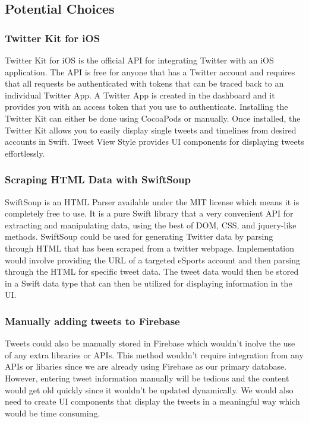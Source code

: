 \documentclass[onecolumn, draftclsnofoot,10pt, compsoc]{IEEEtran}
\begin{document}
\subsection{Potential Choices}
\subsubsection{Twitter Kit for iOS\cite{twitter}}
Twitter Kit for iOS is the official API for integrating Twitter with an iOS application.
The API is free for anyone that has a Twitter account and requires that all requests be authenticated with tokens that can be traced back to an individual Twitter App.
A Twitter App is created in the dashboard and it provides you with an access token that you use to authenticate.
Installing the Twitter Kit can either be done using CocoaPods or manually. 
Once installed, the Twitter Kit allows you to easily display single tweets and timelines from desired accounts in Swift.
Tweet View Style provides UI components for displaying tweets effortlessly. 
\subsubsection{Scraping HTML Data with SwiftSoup\cite{ssoup}}
SwiftSoup is an HTML Parser available under the MIT license which means it is completely free to use. 
It is a pure Swift library that a very convenient API for extracting and manipulating data, using the best of DOM, CSS, and jquery-like methods.
SwiftSoup could be used for generating Twitter data by parsing through HTML that has been scraped from a twitter webpage. 
Implementation would involve providing the URL of a targeted eSports account and then parsing through the HTML for specific tweet data. 
The tweet data would then be stored in a Swift data type that can then be utilized for displaying information in the UI. 
\subsubsection{Manually adding tweets to Firebase\cite{fb}}
Tweets could also be manually stored in Firebase which wouldn't inolve the use of any extra libraries or APIs.
This method wouldn't require integration from any APIs or libaries since we are already using Firebase as our primary database. 
However, entering tweet information manually will be tedious and the content would get old quickly since it wouldn't be updated dynamically.
We would also need to create UI components that display the tweets in a meaningful way which would be time consuming. 
\end{document}
